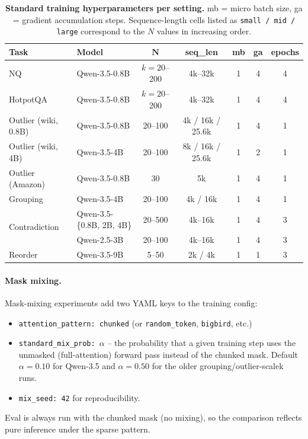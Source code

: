 \begin{table}[h]
\centering
\small
\setlength{\tabcolsep}{4pt}
\begin{tabular}{l l c c c c c}
\toprule
\textbf{Task} & \textbf{Model} & $\bm{N}$ & \textbf{seq\_len} & \textbf{mb} & \textbf{ga} & \textbf{epochs} \\
\midrule
NQ            & Qwen-3.5-0.8B & $k{=}20$--200 & 4k--32k & 1 & 4 & 4 \\
HotpotQA      & Qwen-3.5-0.8B & $k{=}20$--200 & 4k--32k & 1 & 4 & 4 \\
\midrule
Outlier (wiki, 0.8B) & Qwen-3.5-0.8B & 20--100 & 4k / 16k / 25.6k & 1 & 4 & 1 \\
Outlier (wiki, 4B)   & Qwen-3.5-4B   & 20--100 & 8k / 16k / 25.6k & 1 & 2 & 1 \\
Outlier (Amazon)     & Qwen-3.5-0.8B & 30      & 5k       & 1 & 4 & 1 \\
\midrule
Grouping             & Qwen-3.5-4B   & 20--100 & 4k / 16k & 1 & 4 & 1 \\
\midrule
\multirow{2}{*}{Contradiction} & Qwen-3.5-\{0.8B, 2B, 4B\} & 20--500 & 4k--16k & 1 & 4 & 3 \\
                               & Qwen-2.5-3B               & 20--100 & 4k--16k & 1 & 4 & 3 \\
\midrule
Reorder       & Qwen-3.5-9B   & 5--50   & 2k / 4k  & 1 & 1 & 3 \\
\bottomrule
\end{tabular}
\caption{\textbf{Standard training hyperparameters per setting.} mb = micro batch size, ga = gradient accumulation steps. Sequence-length cells listed as \texttt{small / mid / large} correspond to the $N$ values in increasing order.}
\label{tab:hyperparams}
\end{table}

\paragraph{Mask mixing.}
Mask-mixing experiments add two YAML keys to the training config:
\begin{itemize}
\item \texttt{attention\_pattern: chunked} (or \texttt{random\_token}, \texttt{bigbird}, etc.)
\item \texttt{standard\_mix\_prob: $\alpha$} -- the probability that a given training step uses the unmasked (full-attention) forward pass instead of the chunked mask. Default $\alpha{=}0.10$ for Qwen-3.5 and $\alpha{=}0.50$ for the older grouping/outlier-scalek runs.
\item \texttt{mix\_seed: 42} for reproducibility.
\end{itemize}
Eval is always run with the chunked mask (no mixing), so the comparison reflects pure inference under the sparse pattern.

